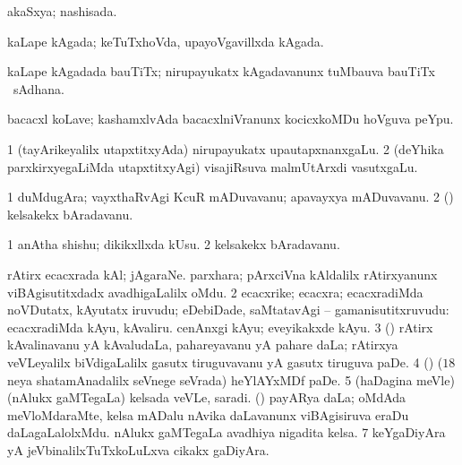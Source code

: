 {\bentry
{} 
\gl{\gu}
\expl{}
\bmng
akaSxya; nashisada. 
\emng
\eentry

\bentry
{} 
\gl{\nA}
\expl{}
\bmng
kaLape kAgada; keTuTxhoVda, upayoVgavillxda kAgada. 
\emng
\eentry

\bentry
{} 
\gl{\nA}
\expl{}
\bmng
kaLape kAgadada bauTiTx; nirupayukatx kAgadavanunx tuMbauva bauTiTx \mo\ sAdhana. 
\emng
\eentry

\bentry
{} 
\gl{\nA}
\expl{}
\bmng
bacacxl koLave; kashamxlvAda bacacxlniVranunx kocicxkoMDu hoVguva peYpu. 
\emng
\eentry

\bentry
{} 
\gl{\nA}
\expl{}
\bmng
\bnum
\num{1} (tayArikeyalilx utapxtitxyAda) nirupayukatx upautapxnanxgaLu. 
\num{2} (deYhika parxkirxyegaLiMda utapxtitxyAgi) visajiRsuva malmUtArxdi vasutxgaLu. 
\enum
\emng
\eentry

\bentry
{} 
\gl{\nA}
\expl{}
\bmng
\bnum
\num{1} duMdugAra; vayxthaRvAgi KcuR mADuvavanu; apavayxya mADuvavanu. 
\num{2} (\AmA) kelsakekx bAradavanu. 
\enum
\emng
\eentry

\bentry
{} 
\gl{\nA}
\expl{}
\bmng
\bnum
\num{1} anAtha shishu; dikikxllxda kUsu. 
\num{2} kelsakekx bAradavanu. 
\enum
\emng
\eentry

\bentry
{} 
\gl{\nA}
\expl{}
\bmng
\bnum
{} 
\banum
{} rAtirx ecacxrada kAl; jAgaraNe. 
 parxhara; pArxciVna kAldalilx rAtirxyanunx viBAgisutitxdadx avadhigaLalilx oMdu. 
\eanum
\numie
\num{2} ecacxrike; ecacxra; ecacxradiMda noVDutatx, kAyutatx iruvudu; eDebiDade, saMtatavAgi -- gamanisutitxruvudu:  ecacxradiMda kAyu, kAvaliru.  cenAnxgi kAyu; eveyikakxde kAyu. 
\num{3} (\ca) rAtirx kAvalinavanu yA kAvaludaLa, pahareyavanu yA pahare daLa; rAtirxya veVLeyalilx biVdigaLalilx gasutx tiruguvavanu yA gasutx tiruguva paDe. 
\num{4} (\ca) ($18$neya shatamAnadalilx seVnege seVrada) heYlAYxMDf paDe. 
\num{5} (haDagina meVle) (nAlukx gaMTegaLa) kelsada veVLe, saradi. 
 (\nw) 
\banum
{} payARya daLa; oMdAda meVloMdaraMte, kelsa mADalu nAvika daLavanunx viBAgisiruva eraDu daLagaLalolxMdu. 
 nAlukx gaMTegaLa avadhiya nigadita kelsa. 
\eanum
\numie
\num{7} keYgaDiyAra yA jeVbinalilxTuTxkoLuLxva cikakx gaDiyAra. 
\enum
\emng

}
